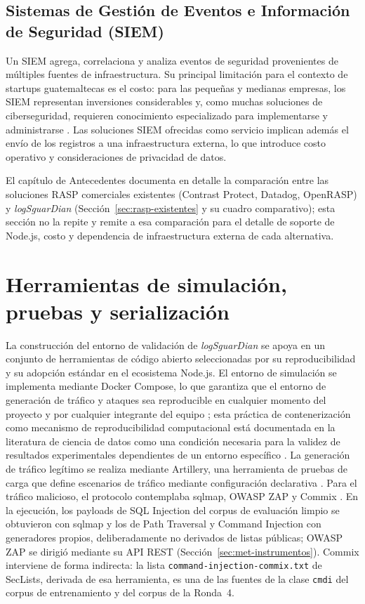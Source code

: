 \subsection{Sistemas de Gestión de Eventos e Información de Seguridad (SIEM)}
Un SIEM agrega, correlaciona y analiza eventos de seguridad provenientes de múltiples fuentes de
infraestructura. Su principal limitación para el contexto de startups guatemaltecas es el costo: para las
pequeñas y medianas empresas, los SIEM representan inversiones considerables y, como muchas
soluciones de ciberseguridad, requieren conocimiento especializado para implementarse y
administrarse \cite{enisa2021smes}. Las soluciones SIEM ofrecidas como servicio implican además el
envío de los registros a una infraestructura externa, lo que introduce costo operativo y
consideraciones de privacidad de datos.

El capítulo de Antecedentes documenta en detalle la comparación entre las soluciones RASP
comerciales existentes (Contrast Protect, Datadog, OpenRASP) y \textit{logSguarDian}
(Sección~\ref{sec:rasp-existentes} y su cuadro comparativo); esta sección no la repite y remite a
esa comparación para el detalle de soporte de Node.js, costo y dependencia de infraestructura
externa de cada alternativa.

\section{Herramientas de simulación, pruebas y serialización}
La construcción del entorno de validación de \textit{logSguarDian} se apoya en un conjunto de
herramientas de código abierto seleccionadas por su reproducibilidad y su adopción estándar en el
ecosistema Node.js. El entorno de simulación se implementa mediante Docker Compose, lo que
garantiza que el entorno de generación de tráfico y ataques sea reproducible en cualquier momento
del proyecto y por cualquier integrante del equipo \cite{dockerdocs}; esta práctica de
contenerización como mecanismo de reproducibilidad computacional está documentada en la
literatura de ciencia de datos como una condición necesaria para la validez de resultados
experimentales dependientes de un entorno específico \cite{moreau2023}. La generación de tráfico
legítimo se realiza mediante Artillery, una herramienta de pruebas de carga que define escenarios
de tráfico mediante configuración declarativa \cite{artillerydocs}. Para el tráfico malicioso, el
protocolo contemplaba sqlmap, OWASP ZAP y Commix \cite{sqlmap, owaspzap, stasinopoulos2019}. En la
ejecución, los payloads de SQL Injection del corpus de evaluación limpio se obtuvieron con sqlmap
y los de Path Traversal y Command Injection con generadores propios, deliberadamente no derivados
de listas públicas; OWASP ZAP se dirigió mediante su API REST (Sección~\ref{sec:met-instrumentos}). Commix
interviene de forma indirecta: la lista \texttt{command-injection-commix.txt} de SecLists, derivada
de esa herramienta, es una de las fuentes de la clase \texttt{cmdi} del corpus de entrenamiento y
del corpus de la Ronda~4.

